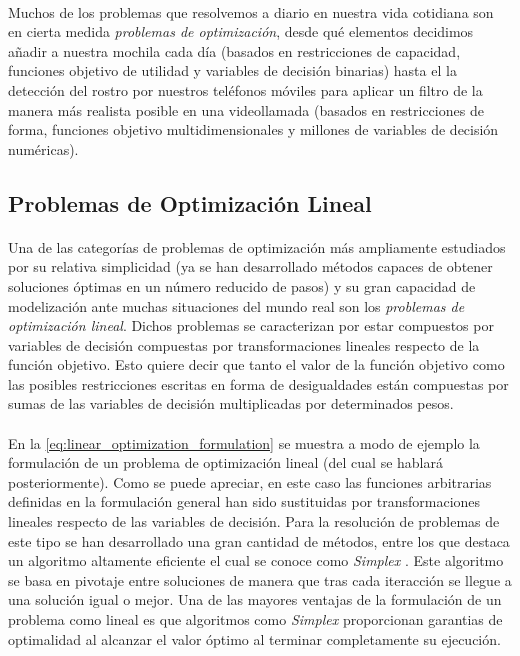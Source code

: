 \documentclass{subfiles}
\begin{document}
        \paragraph{}
        Muchos de los problemas que resolvemos a diario en nuestra vida cotidiana son en cierta medida \emph{problemas de optimización}, desde qué elementos decidimos añadir a nuestra mochila cada día (basados en restricciones de capacidad, funciones objetivo de utilidad y variables de decisión binarias) hasta el la detección del rostro por nuestros teléfonos móviles para aplicar un filtro de la manera más realista posible en una videollamada (basados en restricciones de forma, funciones objetivo multidimensionales y millones de variables de decisión numéricas).

      \subsection{Problemas de Optimización Lineal}
      \label{sec:formulation_linear_problems}

        \paragraph{}
        Una de las categorías de problemas de optimización más ampliamente estudiados por su relativa simplicidad (ya se han desarrollado métodos capaces de obtener soluciones óptimas en un número reducido de pasos) y su gran capacidad de modelización ante muchas situaciones del mundo real son los \emph{problemas de optimización lineal}. Dichos problemas se caracterizan por estar compuestos por variables de decisión compuestas por transformaciones lineales respecto de la función objetivo. Esto quiere decir que tanto el valor de la función objetivo como las posibles restricciones escritas en forma de desigualdades están compuestas por sumas de las variables de decisión multiplicadas por determinados pesos.

        \paragraph{}
        En la \cref{eq:linear_optimization_formulation} se muestra a modo de ejemplo la formulación de un problema de optimización lineal (del cual se hablará posteriormente). Como se puede apreciar, en este caso las funciones arbitrarias definidas en la formulación general han sido sustituidas por transformaciones lineales respecto de las variables de decisión. Para la resolución de problemas de este tipo se han desarrollado una gran cantidad de métodos, entre los que destaca un algoritmo altamente eficiente el cual se conoce como \emph{Simplex} \cite{klee1970good}. Este algoritmo se basa en pivotaje entre soluciones de manera que tras cada iteracción se llegue a una solución igual o mejor. Una de las mayores ventajas de la formulación de un problema como lineal es que algoritmos como \emph{Simplex} proporcionan garantias de optimalidad al alcanzar el valor óptimo al terminar completamente su ejecución.
\end{document}
